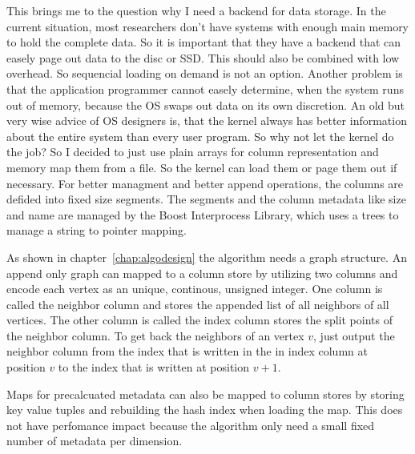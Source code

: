 This brings me to the question why I need a backend for data storage. In the current situation, most researchers don't have systems with enough main memory to hold the complete data. So it is important that they have a backend that can easely page out data to the disc or SSD. This should also be combined with low overhead. So sequencial loading on demand is not an option. Another problem is that the application programmer cannot easely determine, when the system runs out of memory, because the OS swaps out data on its own discretion. An old but very wise advice of OS designers is, that the kernel always has better information about the entire system than every user program. So why not let the kernel do the job? So I decided to just use plain arrays for column representation and memory map them from a file. So the kernel can load them or page them out if necessary. For better managment and better append operations, the columns are defided into fixed size segments. The segments and the column metadata like size and name are managed by the Boost Interprocess Library, which uses a trees to manage a string to pointer mapping.

As shown in chapter~\ref{chap:algodesign} the algorithm needs a graph structure. An append only graph can mapped to a column store by utilizing two columns and encode each vertex as an unique, continous, unsigned integer. One column is called the neighbor column and stores the appended list of all neighbors of all vertices. The other column is called the index column stores the split points of the neighbor column. To get back the neighbors of an vertex $v$, just output the neighbor column from the index that is written in the in index column at position $v$ to the index that is written at position $v+1$.

Maps for precalcuated metadata can also be mapped to column stores by storing key value tuples and rebuilding the hash index when loading the map. This does not have perfomance impact because the algorithm only need a small fixed number of metadata per dimension.

